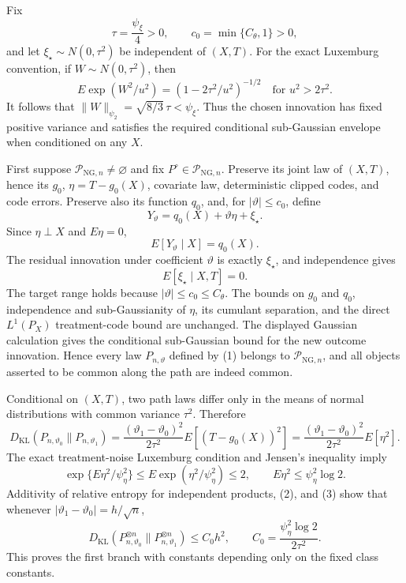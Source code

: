 Fix
\[
 \tau=\frac{\psi_{\xi}}4>0,
 \qquad
 c_0=\min\{C_{\theta},1\}>0,
\]
and let \(\xi_{\star}\sim N(0,\tau^2)\) be independent of \((X,T)\). For the exact Luxemburg convention, if \(W\sim N(0,\tau^2)\), then
\[
 E\exp(W^2/u^2)=(1-2\tau^2/u^2)^{-1/2}
 \quad\text{for }u^2>2\tau^2.
\]
It follows that \(\|W\|_{\psi_2}=\sqrt{8/3}\,\tau<\psi_{\xi}\). Thus the chosen innovation has fixed positive variance and satisfies the required conditional sub-Gaussian envelope when conditioned on any \(X\).

First suppose \(\mathcal P_{\mathrm{NG},n}\neq\varnothing\) and fix \(P^{\circ}\in\mathcal P_{\mathrm{NG},n}\). Preserve its joint law of \((X,T)\), hence its \(g_0\), \(\eta=T-g_0(X)\), covariate law, deterministic clipped codes, and code errors. Preserve also its function \(q_0\), and, for \(|\vartheta|\le c_0\), define
\[
 Y_{\vartheta}=q_0(X)+\vartheta\eta+\xi_{\star}.
 \tag{1}
\]
Since \(\eta\perp X\) and \(E\eta=0\),
\[
 E[Y_{\vartheta}\mid X]=q_0(X).
\]
The residual innovation under coefficient \(\vartheta\) is exactly \(\xi_{\star}\), and independence gives
\[
 E[\xi_{\star}\mid X,T]=0.
\]
The target range holds because \(|\vartheta|\le c_0\le C_{\theta}\). The bounds on \(g_0\) and \(q_0\), independence and sub-Gaussianity of \(\eta\), its cumulant separation, and the direct \(L^1(P_X)\) treatment-code bound are unchanged. The displayed Gaussian calculation gives the conditional sub-Gaussian bound for the new outcome innovation. Hence every law \(P_{n,\vartheta}\) defined by (1) belongs to \(\mathcal P_{\mathrm{NG},n}\), and all objects asserted to be common along the path are indeed common.

Conditional on \((X,T)\), two path laws differ only in the means of normal distributions with common variance \(\tau^2\). Therefore
\[
 D_{\mathrm{KL}}(P_{n,\vartheta_0}\|P_{n,\vartheta_1})
 =\frac{(\vartheta_1-\vartheta_0)^2}{2\tau^2}E[(T-g_0(X))^2]
 =\frac{(\vartheta_1-\vartheta_0)^2}{2\tau^2}E[\eta^2].
 \tag{2}
\]
The exact treatment-noise Luxemburg condition and Jensen's inequality imply
\[
 \exp\{E\eta^2/\psi_{\eta}^2\}
 \le E\exp(\eta^2/\psi_{\eta}^2)\le2,
 \qquad
 E\eta^2\le\psi_{\eta}^2\log2.
 \tag{3}
\]
Additivity of relative entropy for independent products, (2), and (3) show that whenever \(|\vartheta_1-\vartheta_0|=h/\sqrt n\),
\[
 D_{\mathrm{KL}}(P_{n,\vartheta_0}^{\otimes n}\|P_{n,\vartheta_1}^{\otimes n})
 \le C_0h^2,
 \qquad
 C_0=\frac{\psi_{\eta}^2\log2}{2\tau^2}.
 \tag{4}
\]
This proves the first branch with constants depending only on the fixed class constants.

